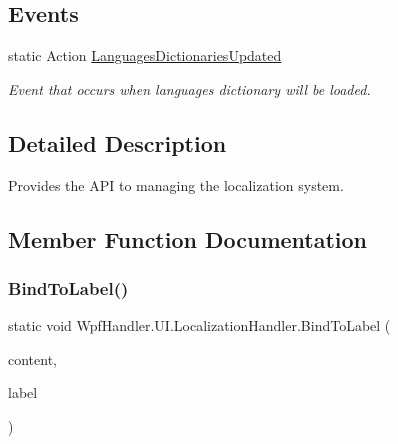 \subsection*{Events}
\begin{DoxyCompactItemize}
\item 
static Action \mbox{\hyperlink{class_wpf_handler_1_1_u_i_1_1_localization_handler_afa222c8723785db39e70a9694e2e5398}{Languages\+Dictionaries\+Updated}}
\begin{DoxyCompactList}\small\item\em Event that occurs when languages dictionary will be loaded. \end{DoxyCompactList}\end{DoxyCompactItemize}


\subsection{Detailed Description}
Provides the A\+PI to managing the localization system. 



\subsection{Member Function Documentation}
\mbox{\label{class_wpf_handler_1_1_u_i_1_1_localization_handler_a619201b52fa3480e4bdb75231ebdd666}} 
\subsubsection{\texorpdfstring{Bind\+To\+Label()}{BindToLabel()}\hspace{0.1cm}{\footnotesize\ttfamily [1/2]}}
{\footnotesize\ttfamily static void Wpf\+Handler.\+U\+I.\+Localization\+Handler.\+Bind\+To\+Label (\begin{DoxyParamCaption}\item[{this \mbox{\hyperlink{class_wpf_handler_1_1_u_i_1_1_g_u_i_content}{G\+U\+I\+Content}}}]{content,  }\item[{\mbox{\hyperlink{interface_wpf_handler_1_1_u_i_1_1_controls_1_1_i_label}{I\+Label}}}]{label }\end{DoxyParamCaption})\hspace{0.3cm}{\ttfamily [static]}}



